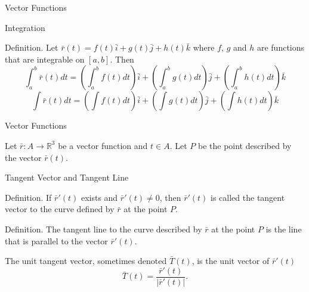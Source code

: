 \documentclass{beamer}
\begin{document}
    \begin{frame}[t]{Vector Functions}
        \begin{block}{Integration}
            \par \textcolor{yy}{Definition.} Let $\bar{r}(t) = f(t) \bar{i} + g(t) \bar{j} + h(t) \bar{k}$ where $f$, $g$ and $h$ are functions that are integrable on $[a,b]$. Then
            \begin{equation*}
                \int_{a}^{b} \bar{r}(t) d t=\left(\int_{a}^{b} f(t) d t\right) \bar{i}+\left(\int_{a}^{b} g(t) d t\right) \bar{j}+\left(\int_{a}^{b} h(t) d t\right) \bar{k}
            \end{equation*}
            \begin{equation*}
                \int \bar{r}(t) d t=\left(\int f(t) d t\right) \bar{i}+\left(\int g(t) d t\right) \bar{j}+\left(\int h(t) d t\right) \bar{k}
            \end{equation*}
        \end{block}
    \end{frame}

    \begin{frame}[t]{Vector Functions}
        \par Let $\bar{r}: A \to \mathbb{R}^3$ be a vector function and $t \in A$. Let $P$ be the point described by the vector $\bar{r}(t)$.
        \begin{block}{Tangent Vector and Tangent Line}
            \par \textcolor{yy}{Definition.} If $\bar{r}'(t)$ exists and $\bar{r}'(t) \neq 0$, then $\bar{r}'(t)$ is called the \textcolor{yy}{tangent vector} to the curve defined by $\bar{r}$ at the point $P$.

            \phantom{zjy}
            
            \par \textcolor{yy}{Definition.} The \textcolor{yy}{tangent line} to the curve described by $\bar{r}$ at the point $P$ is the line that is parallel to the vector $\bar{r}'(t)$.
        \end{block}

        \par The \textcolor{yy}{unit tangent vector}, sometimes denoted $\bar{T}(t)$, is the unit vector of $\bar{r}'(t)$
        \begin{equation*}
            \bar{T} (t) = \dfrac{\bar{r}'(t)}{|\bar{r}'(t)|} .
        \end{equation*}
    \end{frame}
\end{document}
